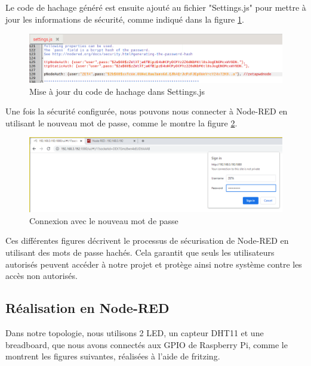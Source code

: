 Le code de hachage généré est ensuite ajouté au fichier "Settings.js" pour mettre à jour les informations de sécurité, comme indiqué dans la figure \ref{Chap4.3.11}.

\begin{figure}[H]
\centering
\includegraphics[width=15cm]{Images/Node-4.png}
\caption{Mise à jour du code de hachage dans Settings.js}
\label{Chap4.3.11}
\end{figure}

Une fois la sécurité configurée, nous pouvons nous connecter à Node-RED en utilisant le nouveau mot de passe, comme le montre la figure \ref{Chap4.3.12}.

\begin{figure}[H]
\centering
\includegraphics[width=15cm]{Images/Node-5.png}
\caption{Connexion avec le nouveau mot de passe}
\label{Chap4.3.12}
\end{figure}

Ces différentes figures décrivent le processus de sécurisation de Node-RED en utilisant des mots de passe hachés. Cela garantit que seuls les utilisateurs autorisés peuvent accéder à notre projet et protège ainsi notre système contre les accès non autorisés.
\newpage

\subsection{Réalisation en Node-RED}

Dans notre topologie, nous utilisons 2 LED, un capteur DHT11 et une breadboard, que nous avons connectés aux GPIO de Raspberry Pi, comme le montrent les figures suivantes, réalisées à l'aide de fritzing.

